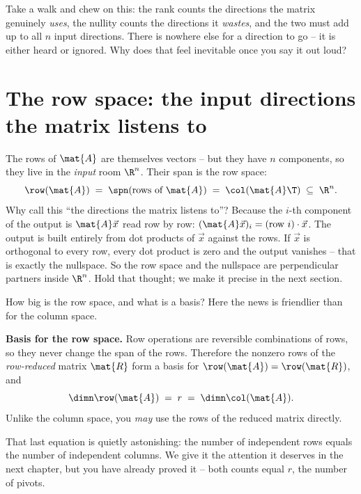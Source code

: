 \begin{walkbox}
Take a walk and chew on this: the rank counts the directions the matrix genuinely \emph{uses},
the nullity counts the directions it \emph{wastes}, and the two must add up to all $n$ input
directions. There is nowhere else for a direction to go -- it is either heard or ignored. Why does
that feel inevitable once you say it out loud?
\end{walkbox}

\section{The row space: the input directions the matrix listens to}

The rows of $\mat{A}$ are themselves vectors -- but they have $n$ components, so they live in the
\emph{input} room $\R^n$. Their span is the row space:
\[
  \row(\mat{A}) \;=\; \spn(\text{rows of }\mat{A}) \;=\; \col(\mat{A}\T) \;\subseteq\; \R^n.
\]
Why call this ``the directions the matrix listens to''? Because the $i$-th component of the output
is $\mat{A}\vec{x}$ read row by row: $(\mat{A}\vec{x})_i = (\text{row }i)\cdot \vec{x}$. The output
is built entirely from dot products of $\vec{x}$ against the rows. If $\vec{x}$ is orthogonal to
every row, every dot product is zero and the output vanishes -- that is exactly the nullspace. So
the row space and the nullspace are perpendicular partners inside $\R^n$. Hold that thought; we
make it precise in the next section.

How big is the row space, and what is a basis? Here the news is friendlier than for the column
space.

\begin{formalbox}
\textbf{Basis for the row space.} Row operations are reversible combinations of rows, so they
never change the span of the rows. Therefore the nonzero rows of the \emph{row-reduced} matrix
$\mat{R}$ form a basis for $\row(\mat{A})=\row(\mat{R})$, and
\[
  \dimn \row(\mat{A}) \;=\; r \;=\; \dimn\col(\mat{A}).
\]
Unlike the column space, you \emph{may} use the rows of the reduced matrix directly.
\end{formalbox}

That last equation is quietly astonishing: the number of independent rows equals the number of
independent columns. We give it the attention it deserves in the next chapter, but you have already
proved it -- both counts equal $r$, the number of pivots.

